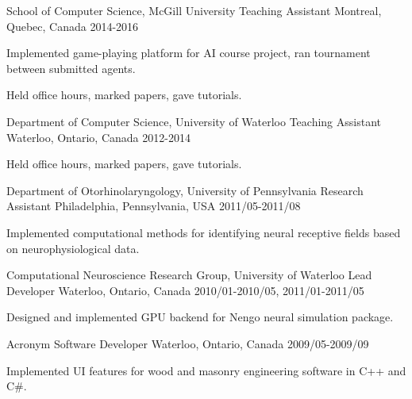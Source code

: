 \begin{cventries}
  \cventry
    {School of Computer Science, McGill University}
    {Teaching Assistant}
    {Montreal, Quebec, Canada}
    {2014-2016}
    {
      \begin{cvitems}
        \item {Implemented game-playing platform for AI course project, ran tournament between submitted agents.}
        \item {Held office hours, marked papers, gave tutorials.}
      \end{cvitems}
    }
   \cventry
    {Department of Computer Science, University of Waterloo}
    {Teaching Assistant}
    {Waterloo, Ontario, Canada}
    {2012-2014}
    {
      \begin{cvitems}
        \item {Held office hours, marked papers, gave tutorials.}
      \end{cvitems}
    }
  \cventry
    {Department of Otorhinolaryngology, University of Pennsylvania}
    {Research Assistant}
    {Philadelphia, Pennsylvania, USA}
    {2011/05-2011/08}
    {
      \begin{cvitems}
        \item {Implemented computational methods for identifying neural receptive fields based on neurophysiological data.}
      \end{cvitems}
    }
   \cventry
    {Computational Neuroscience Research Group, University of Waterloo}
    {Lead Developer}
    {Waterloo, Ontario, Canada}
    {2010/01-2010/05, 2011/01-2011/05}
    {
      \begin{cvitems}
        \item {Designed and implemented GPU backend for Nengo neural simulation package.}
      \end{cvitems}
    }
   \cventry
    {Acronym Software}
    {Developer}
    {Waterloo, Ontario, Canada}
    {2009/05-2009/09}
    {
      \begin{cvitems}
        \item {Implemented UI features for wood and masonry engineering software in C++ and C\#.}
      \end{cvitems}
    }


\end{cventries}
